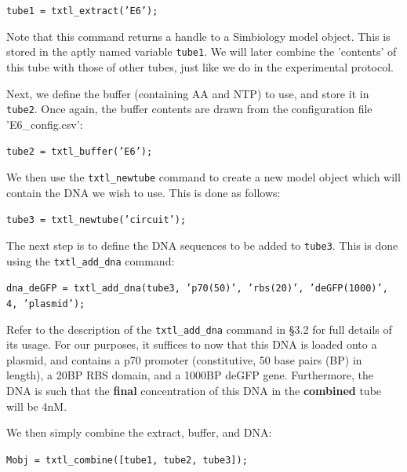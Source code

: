 \documentclass[english]{report}
\begin{document}
				\begin{flushleft}
						\texttt{tube1 = txtl\_extract('E6');} 
				\end{flushleft}	
				
				Note that this command returns a handle to a Simbiology model object. This is stored in the aptly named variable \texttt{tube1}. We will later combine the 'contents' of this tube with those of other tubes, just like we do in the experimental protocol. 
				
Next, we define the buffer (containing AA and NTP) to use, and store it in \texttt{tube2}. Once again, the buffer contents are drawn from the configuration file \textsf{'E6\_config.csv'}:

				\begin{flushleft}
						\texttt{tube2 = txtl\_buffer('E6');} \\	
				\end{flushleft}	 
		
We then use the \texttt{txtl\_newtube} command to create a new model object which will contain the DNA we wish to use. This is done as follows:
		
				\begin{flushleft}
						\texttt{tube3 = txtl\_newtube('circuit');} \\	
				\end{flushleft}	 
				
The next step is to define the DNA sequences to be added to \texttt{tube3}. This is done using the \texttt{txtl\_add\_dna} command:

				\begin{flushleft}
						\texttt{dna\_deGFP = txtl\_add\_dna(tube3, 'p70(50)', 'rbs(20)', 'deGFP(1000)', 4, 'plasmid');} \\	
				\end{flushleft}
Refer to the description of the \texttt{txtl\_add\_dna} command in \S 3.2 for full details of its usage. For our purposes, it suffices to now that this DNA is loaded onto a plasmid, and contains a p70 promoter (constitutive, 50 base pairs (BP) in length), a 20BP RBS domain, and a 1000BP deGFP gene. Furthermore, the DNA is such that the \textbf{final} concentration of this DNA in the \textbf{combined} tube will be 4{\color{red}nM}. 

We then simply combine the extract, buffer, and DNA:

				\begin{flushleft}
						\texttt{Mobj = txtl\_combine([tube1, tube2, tube3]);} \\	
				\end{flushleft}
							
\end{document}
